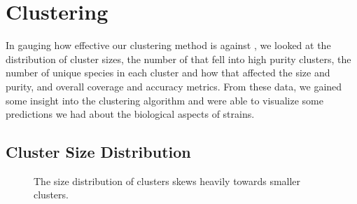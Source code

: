 \section{Clustering}\label{sec:clusteringbsresults}
In gauging how effective our clustering method is against \cplop{}, we looked at the distribution of cluster sizes, the number of \isols{} that fell into high purity clusters, the number of unique species in each cluster and how that affected the size and purity, and overall coverage and accuracy metrics.
From these data, we gained some insight into the clustering algorithm and were able to visualize some predictions we had about the biological aspects of strains.  

\subsection{Cluster Size Distribution}
\begin{figure}[ht!]
    \centering
    \hfill
    \hfill
    \caption{The size distribution of clusters skews heavily towards smaller clusters.}
    \label{fig:clust_size_dist}
\end{figure}

